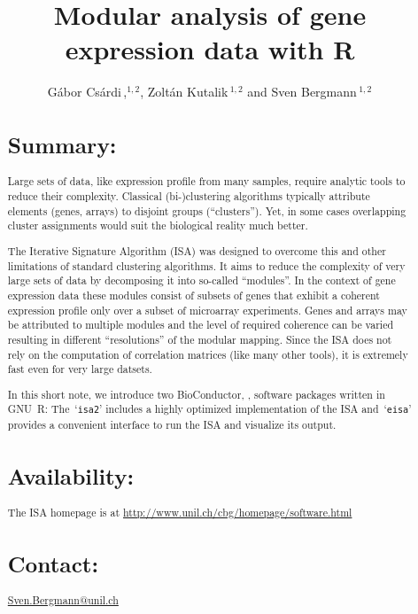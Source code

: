 \documentclass{bioinfo}
\newcommand{\Rpackage}[1]{`\texttt{#1}'}
\begin{document}

\title[Modular analysis]{Modular analysis of gene expression data with R}
\author[G\'abor Cs\'ardi \textit{et~al}]{G\'abor Cs\'ardi\,,$^{1,2}$,
  Zolt\'an Kutalik\,$^{1,2}$ and Sven Bergmann\,$^{1,2}$}
\address{$^{1}$Department of Medical Genetics, and
  $^{2}$Swiss Institute of Bioinformatics,
  University of Lausanne, Rue de Bugnon 27, CH-1005 Lausanne,
  Switzerland.}



\maketitle

\begin{abstract}
\section{Summary:}
Large sets of data, like expression profile from many samples, require
analytic tools to reduce their complexity. Classical (bi-)clustering
algorithms typically attribute elements (genes, arrays) to disjoint groups
(``clusters''). Yet, in some cases overlapping cluster assignments would suit
the biological reality much better.

The Iterative Signature Algorithm (ISA) was designed to overcome this and
other limitations of standard clustering algorithms. It aims to reduce the
complexity of very large sets of data by decomposing it into so-called
``modules''. In the context of gene expression data these modules consist of
subsets of genes that exhibit a coherent expression profile only over a
subset of microarray experiments. Genes and arrays may be attributed to
multiple modules and the level of required coherence can be varied resulting
in different ``resolutions'' of the modular mapping. Since the ISA does not
rely on the computation of correlation matrices (like many other tools), it
is extremely fast even for very large datsets.

In this short note, we introduce two BioConductor, \cite{BioC}, software
packages written in GNU~R: The~\Rpackage{isa2} includes a highly optimized
implementation of the ISA and~\Rpackage{eisa} provides a convenient interface
to run the ISA and visualize its output.

\section{Availability:}
The ISA homepage is at \href{http://www.unil.ch/cbg/homepage/software.html}%
{\url{http://www.unil.ch/cbg/homepage/software.html}}
\section{Contact:} \href{Sven.Bergmann@unil.ch}{Sven.Bergmann@unil.ch}
\end{abstract}
\end{document}
